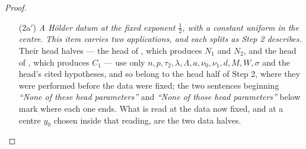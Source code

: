\begin{proof}
\begin{enumerate}
  () and $U$ continuous on $\Omega_1$.  \emph{Three of its
  eleven conclusions are not used, and it is worth saying which.}  The
  $C^{\alpha_4}$ membership on balls of radius $d/16$ centred in $\Omega_1$
  () is \emph{deliberately} declined, because its exponent
  $\alpha_4$ comes from (C4) and so depends on $M$, whereas $\lambda_0$ is bound
  before $M$ --- (2a$'$) buys the same kind of datum at the fixed exponent
  $\tfrac12$ instead, from part (ii) of Theorem~3 through (C5).  The remaining two,
  $d/2\le\operatorname{dist}(x,y)$ for $x\in\Omega_1$, $y\notin\Omega$ and
  $\overline B_{d/2}(x)\subseteq\Omega$ for $x\in\Omega_1$, are simply not
  needed: this proof separates $\Omega'$ from $\partial\Omega$ directly from the
  theorem's own hypothesis, at the scale $d$ rather than $d/2$.  Note for later
  that $B_{d/2}(x)\subseteq\Omega_1$ for every
  $x\in\Omega'$: a point $y$ with $|y-x|<d/2$ cannot lie outside $\Omega_1$, by
  the separation clause $d/2\le\operatorname{dist}(x,y)$ for $x\in\Omega'$,
  $y\notin\Omega_1$ just listed.
\item[(2a$'$)] \emph{A H\"older datum at the fixed exponent $\tfrac12$, with a
  constant uniform in the centre.}  \emph{This item carries two applications,
  and each splits as Step 2 describes.}  Their head halves --- the head of
  , which produces $N_1$ and $N_2$, and the
  head of , which produces $C_1$ --- use only
  $n,p,\tau_2,\lambda,\Lambda,a,\nu_0,\nu_1,d,M,W,\sigma$ and the head's cited
  hypotheses, and so belong to the head half of Step 2, where they were
  performed before the data were fixed; the two sentences beginning
  \emph{``None of these head parameters''} and \emph{``None of those head
  parameters''} below mark where each one ends.  What is read at the data now
  fixed, and at a centre $y_0$ chosen inside that reading, are the two data
  halves.


\end{enumerate}
\end{proof}
